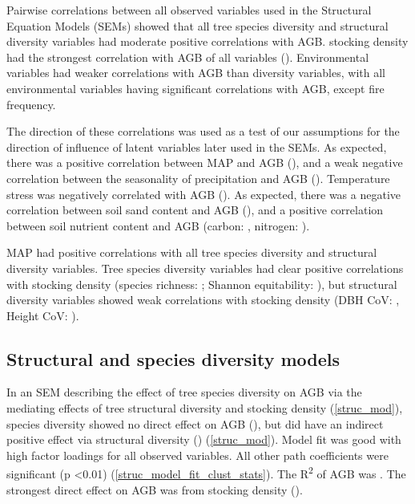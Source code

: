 \documentclass[11pt,a4paper]{article}
\begin{document}
Pairwise correlations between all observed variables used in the Structural Equation Models (SEMs) showed that all tree species diversity and structural diversity variables had moderate positive correlations with AGB. stocking density had the strongest correlation with AGB of all variables  (\ccib{}). Environmental variables had weaker correlations with AGB than diversity variables, with all environmental variables having significant correlations with AGB, except fire frequency.

The direction of these correlations was used as a test of our assumptions for the direction of influence of latent variables later used in the SEMs. As expected, there was a positive correlation between MAP and AGB (\ccmb{}), and a weak negative correlation between the seasonality of precipitation and AGB (\ccmcb{}). Temperature stress was  negatively correlated  with AGB (\cctcb{}). As expected, there was a negative correlation between soil sand content and AGB (\ccsb{}), and a positive correlation between soil nutrient content and AGB (carbon: \ccob{}, nitrogen: \ccnb{}). 

MAP had positive correlations with all tree species diversity and structural diversity variables. Tree species diversity variables had clear positive correlations with stocking density (species richness: \ccsi{}; Shannon equitability: \ccei{}), but structural diversity variables showed weak correlations with stocking density (DBH CoV: \ccdvi{}, Height CoV: \cchvi{}).

\subsection{Structural and species diversity models}

In an SEM describing the effect of tree species diversity on AGB via the mediating effects of tree structural diversity and stocking density (\autoref{struc_mod}), species diversity showed no direct effect on AGB (\strucbetadb{}), but did have an indirect positive effect via structural diversity (\strucbetadib{}) (\autoref{struc_mod}). Model fit was good with high factor loadings for all observed variables. All other path coefficients were significant (p <0.01) (\autoref{struc_model_fit_clust_stats}). The R\textsuperscript{2} of AGB was \strucrsq{}. The strongest direct effect on AGB was from stocking density (\strucbetaib{}).
\end{document}
